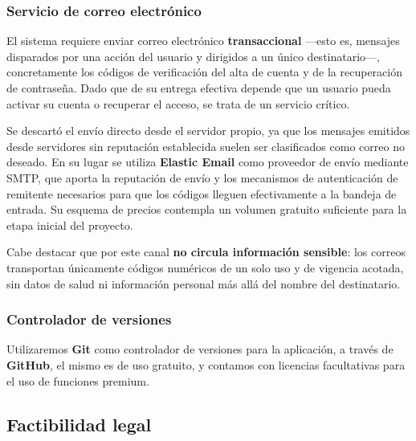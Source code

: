 \documentclass[a4paper,12pt]{article}
\begin{document}
    \subsubsection{Servicio de correo electrónico}
    \par El sistema requiere enviar correo electrónico \textbf{transaccional} —esto es, mensajes disparados por una acción del usuario y dirigidos a un único destinatario—, concretamente los códigos de verificación del alta de cuenta y de la recuperación de contraseña. Dado que de su entrega efectiva depende que un usuario pueda activar su cuenta o recuperar el acceso, se trata de un servicio crítico.
    \par Se descartó el envío directo desde el servidor propio, ya que los mensajes emitidos desde servidores sin reputación establecida suelen ser clasificados como correo no deseado. En su lugar se utiliza \textbf{Elastic Email} como proveedor de envío mediante SMTP, que aporta la reputación de envío y los mecanismos de autenticación de remitente necesarios para que los códigos lleguen efectivamente a la bandeja de entrada. Su esquema de precios contempla un volumen gratuito suficiente para la etapa inicial del proyecto.
    \par Cabe destacar que por este canal \textbf{no circula información sensible}: los correos transportan únicamente códigos numéricos de un solo uso y de vigencia acotada, sin datos de salud ni información personal más allá del nombre del destinatario.
    \subsubsection{Controlador de versiones}
    \par Utilizaremos \textbf{Git} como controlador de versiones para la aplicación, a través de \textbf{GitHub}, el mismo es de uso gratuito, y contamos con licencias facultativas para el uso de funciones premium.
    \subsection{Factibilidad legal}
\end{document}
